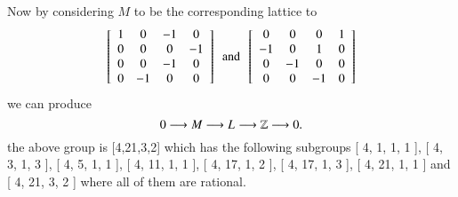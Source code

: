 Now by considering $M$ to be the corresponding lattice to 
$$
 \left[ \begin {array}{cccc} 1&0&-1&0\\0&0&0&-1
\\0&0&-1&0\\0&-1&0&0\end {array}
 \right] 
 \,\,\, \text{and} \,\,\,
 \left[ \begin {array}{cccc} 0&0&0&1\\-1&0&1&0
\\0&-1&0&0\\0&0&-1&0\end {array}
 \right] 
$$
we can produce
$$
0 \longrightarrow M_{} \longrightarrow L_{} \longrightarrow \mathbb{Z} \longrightarrow 0
.$$
the above group is [4,21,3,2] which has the following subgroups [ 4, 1, 1, 1 ], [ 4, 3, 1, 3 ], [ 4, 5, 1, 1 ], [ 4, 11, 1, 1 ], [ 4, 17, 1, 2 ], [ 4, 17, 1, 3 ], [ 4, 21, 1, 1 ] and [ 4, 21, 3, 2 ] 
where all of them are rational.


